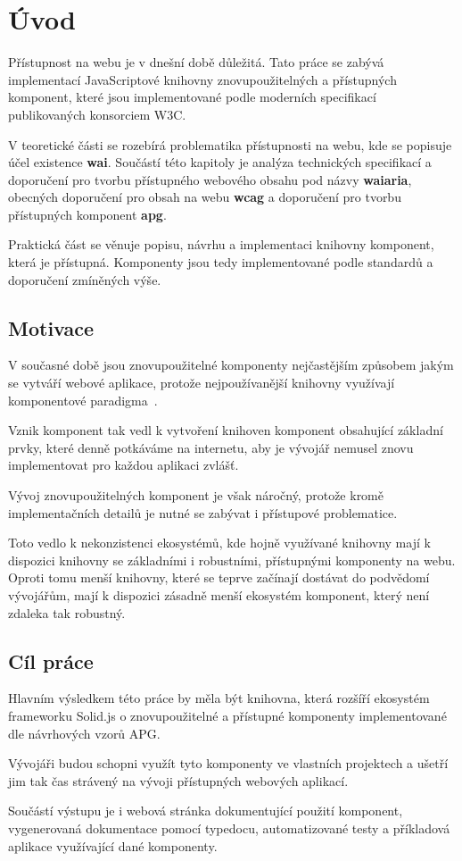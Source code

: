 \chapter{Úvod}

Přístupnost na webu je v dnešní době důležitá. Tato práce se zabývá implementací JavaScriptové knihovny
znovupoužitelných a přístupných komponent, které jsou implementované podle moderních specifikací publikovaných konsorciem W3C.

V teoretické části se rozebírá problematika přístupnosti na webu, kde se popisuje účel existence \textbf{\gls{wai}}.
Součástí této kapitoly je analýza technických specifikací a doporučení pro tvorbu přístupného webového obsahu
pod názvy \textbf{\gls{waiaria}}, obecných doporučení pro obsah na webu \textbf{\gls{wcag}} a doporučení pro tvorbu přístupných komponent \textbf{\gls{apg}}.

Praktická část se věnuje popisu, návrhu a implementaci knihovny komponent,
která je přístupná. Komponenty jsou tedy implementované podle standardů a doporučení zmíněných výše.

\section{Motivace}

V současné době jsou znovupoužitelné komponenty nejčastějším způsobem jakým se vytváří webové aplikace, protože nejpoužívanější knihovny využívají komponentové paradigma~\cite{react,vue,solid,svelte}.

Vznik komponent tak vedl k vytvoření knihoven komponent obsahující základní prvky, které denně potkáváme na internetu, aby je vývojář nemusel znovu implementovat pro každou aplikaci zvlášť.

Vývoj znovupoužitelných komponent je však náročný, protože kromě implementačních detailů je nutné se zabývat i přístupové problematice.

Toto vedlo k nekonzistenci ekosystémů, kde hojně využívané knihovny mají k dispozici knihovny se základními i robustními, přístupnými komponenty na webu. Oproti tomu menší knihovny, které se teprve začínají dostávat do podvědomí vývojářům, mají k dispozici zásadně menší ekosystém komponent, který není zdaleka tak robustný.

\section{Cíl práce}

Hlavním výsledkem této práce by měla být knihovna, která rozšíří ekosystém frameworku Solid.js o znovupoužitelné a přístupné komponenty implementované dle návrhových vzorů APG.

Vývojáři budou schopni využít tyto komponenty ve vlastních projektech a ušetří jim tak čas strávený na vývoji přístupných webových aplikací.

Součástí výstupu je i webová stránka dokumentující použití komponent, vygenerovaná dokumentace pomocí typedocu, automatizované testy a příkladová aplikace využívající dané komponenty.
